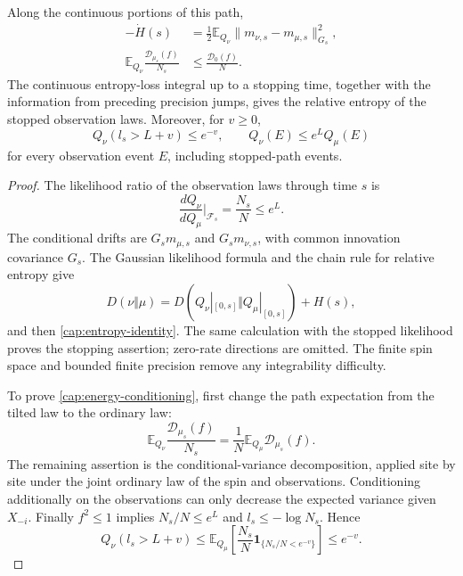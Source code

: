 \begin{lemma}\label{cap:observation-identities}
Along the continuous portions of this path,
\begin{align}
 -\dot H(s)
 &=\tfrac12\mathbb E_{Q_\nu}
       \|m_{\nu,s}-m_{\mu,s}\|_{G_s}^2,
       \label{cap:entropy-identity}\\
 \mathbb E_{Q_\nu}
     \frac{\mathcal D_{\mu_s}(f)}{N_s}
 &\le\frac{\mathcal D_0(f)}N.
       \label{cap:energy-conditioning}
\end{align}
The continuous entropy-loss integral up to a stopping time, together with
the information from preceding precision jumps, gives the relative entropy
of the stopped observation laws. Moreover, for $v\ge0$,
\begin{equation}\label{cap:conditional-entropy-tail}
 Q_\nu(l_s>L+v)\le e^{-v},\qquad
 Q_\nu(E)\le e^L Q_\mu(E)
\end{equation}
for every observation event $E$, including stopped-path events.
\end{lemma}

\begin{proof}
The likelihood ratio of the observation laws through time $s$ is
\[
 \frac{dQ_\nu}{dQ_\mu}\bigg|_{\mathcal F_s}=\frac{N_s}{N}\le e^L.
\]
The
conditional drifts are $G_sm_{\mu,s}$ and $G_sm_{\nu,s}$, with common
innovation covariance $G_s$.  The Gaussian likelihood formula and the
chain rule for relative entropy give
\[
 D(\nu\Vert\mu)
 =D(Q_\nu|_{[0,s]}\Vert Q_\mu|_{[0,s]})+H(s),
\]
and then \eqref{cap:entropy-identity}. The same calculation with the stopped
likelihood proves the stopping assertion; zero-rate directions are omitted.
The finite spin space and bounded finite precision remove any integrability
difficulty.

To prove \eqref{cap:energy-conditioning}, first change the path expectation
from the tilted law to the ordinary law:
\[
 \mathbb E_{Q_\nu}\frac{\mathcal D_{\mu_s}(f)}{N_s}
 =\frac1N\mathbb E_{Q_\mu}\mathcal D_{\mu_s}(f).
\]
The remaining assertion is the conditional-variance
decomposition, applied site by site under the joint ordinary law of the spin
and observations. Conditioning additionally on the observations can only
decrease the expected variance given $X_{-i}$. Finally $f^2\le1$ implies
$N_s/N\le e^L$ and $l_s\le-\log N_s$. Hence
\[
 Q_\nu(l_s>L+v)
 \le\mathbb E_{Q_\mu}
       \left[\frac{N_s}{N}\mathbf1_{\{N_s/N<e^{-v}\}}\right]
 \le e^{-v}.
\]
\end{proof}


